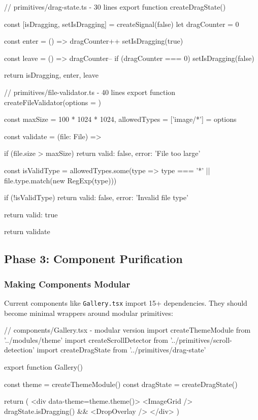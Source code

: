 \documentclass[11pt]{article}
\begin{document}
\begin{typescriptcode}
// primitives/drag-state.ts - 30 lines
export function createDragState() {
  const [isDragging, setIsDragging] = createSignal(false)
  let dragCounter = 0
  
  const enter = () => {
    dragCounter++
    setIsDragging(true)
  }
  
  const leave = () => {
    dragCounter--
    if (dragCounter === 0) setIsDragging(false)
  }
  
  return { isDragging, enter, leave }
}

// primitives/file-validator.ts - 40 lines
export function createFileValidator(options = {}) {
  const { maxSize = 100 * 1024 * 1024, allowedTypes = ['image/*'] } = options
  
  const validate = (file: File) => {
    if (file.size > maxSize) {
      return { valid: false, error: 'File too large' }
    }
    
    const isValidType = allowedTypes.some(type => 
      type === '*' || file.type.match(new RegExp(type)))
    
    if (!isValidType) {
      return { valid: false, error: 'Invalid file type' }
    }
    
    return { valid: true }
  }
  
  return { validate }
}
\end{typescriptcode}

\subsection{Phase 3: Component Purification}

\subsubsection{Making Components Modular}

Current components like \texttt{Gallery.tsx} import 15+ dependencies. They should become minimal wrappers around modular primitives:

\begin{typescriptcode}
// components/Gallery.tsx - modular version
import { createThemeModule } from '../modules/theme'
import { createScrollDetector } from '../primitives/scroll-detection'
import { createDragState } from '../primitives/drag-state'

export function Gallery() {
  const theme = createThemeModule()
  const dragState = createDragState()
  
  return (
    <div data-theme={theme.theme()}>
      <ImageGrid />
      {dragState.isDragging() && <DropOverlay />}
    </div>
  )
}
\end{typescriptcode}
\end{document}
